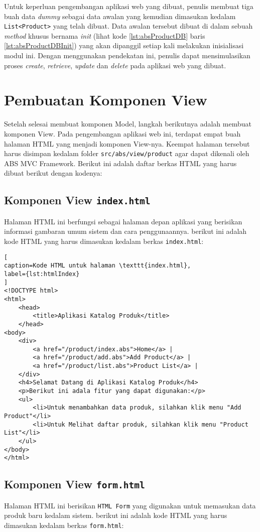 Untuk keperluan pengembangan aplikasi web yang dibuat, penulis membuat tiga buah data \textit{dummy} sebagai data awalan yang kemudian dimasukan kedalam \texttt{List<Product>} yang telah dibuat. Data awalan tersebut dibuat di dalam sebuah \textit{method} khusus bernama \textit{init} (lihat kode \ref{lst:absProductDB} baris \ref{lst:absProductDBInit}) yang akan dipanggil setiap kali melakukan inisialisasi modul ini. Dengan menggunakan pendekatan ini, penulis dapat mensimulasikan proses \textit{create}, \textit{retrieve}, \textit{update} dan \textit{delete} pada aplikasi web yang dibuat.

\section{Pembuatan Komponen View}

Setelah selesai membuat komponen Model, langkah berikutnya adalah membuat komponen View. Pada pengembangan aplikasi web ini, terdapat empat buah halaman HTML yang menjadi komponen View-nya. Keempat halaman tersebut harus disimpan kedalam folder \texttt{src/abs/view/product} agar dapat dikenali oleh ABS MVC Framework. Berikut ini adalah daftar berkas HTML yang harus dibuat berikut dengan kodenya:

\subsection{Komponen View \texttt{index.html}}
Halaman HTML ini berfungsi sebagai halaman depan aplikasi yang berisikan informasi gambaran umum sistem dan cara penggunaannya. berikut ini adalah kode HTML yang harus dimasukan kedalam berkas \texttt{index.html}:

\begin{lstlisting}[
caption=Kode HTML untuk halaman \texttt{index.html},
label={lst:htmlIndex}
]
<!DOCTYPE html>
<html>
	<head>
		<title>Aplikasi Katalog Produk</title>
	</head>
<body>
	<div>
		<a href="/product/index.abs">Home</a> |
		<a href="/product/add.abs">Add Product</a> |
		<a href="/product/list.abs">Product List</a> |
	</div>
	<h4>Selamat Datang di Aplikasi Katalog Produk</h4>
	<p>Berikut ini adala fitur yang dapat digunakan:</p>
	<ul>
		<li>Untuk menambahkan data produk, silahkan klik menu "Add Product"</li>
		<li>Untuk Melihat daftar produk, silahkan klik menu "Product List"</li>
	</ul>
</body>
</html>
\end{lstlisting}

\subsection{Komponen View \texttt{form.html}}
Halaman HTML ini berisikan \texttt{HTML Form} yang digunakan untuk memasukan data produk baru kedalam sistem. berikut ini adalah kode HTML yang harus dimasukan kedalam berkas \texttt{form.html}:

